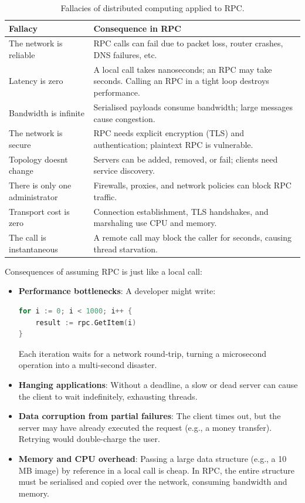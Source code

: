 \documentclass[a4paper]{article}
\begin{document}
\begin{table}[H]
\centering
\begin{tabular}{|p{4.5cm}|p{9cm}|}
\hline
\textbf{Fallacy} & \textbf{Consequence in RPC} \\
\hline
The network is reliable & RPC calls can fail due to packet loss, router crashes, DNS failures, etc. \\
Latency is zero & A local call takes nanoseconds; an RPC may take seconds. Calling an RPC in a tight loop destroys performance. \\
Bandwidth is infinite & Serialised payloads consume bandwidth; large messages cause congestion. \\
The network is secure & RPC needs explicit encryption (TLS) and authentication; plaintext RPC is vulnerable. \\
Topology doesnt change & Servers can be added, removed, or fail; clients need service discovery. \\
There is only one administrator & Firewalls, proxies, and network policies can block RPC traffic. \\
Transport cost is zero & Connection establishment, TLS handshakes, and marshaling use CPU and memory. \\
The call is instantaneous & A remote call may block the caller for seconds, causing thread starvation. \\
\hline
\end{tabular}
\caption{Fallacies of distributed computing applied to RPC.}
\end{table}

Consequences of assuming RPC is just like a local call:

\begin{itemize}
    \item \textbf{Performance bottlenecks}: A developer might write:
        \begin{lstlisting}[language=Go]
for i := 0; i < 1000; i++ {
    result := rpc.GetItem(i)
}
\end{lstlisting}
        Each iteration waits for a network round-trip, turning a microsecond operation into a multi-second disaster.
    \item \textbf{Hanging applications}: Without a deadline, a slow or dead server can cause the client to wait indefinitely, exhausting threads.
    \item \textbf{Data corruption from partial failures}: The client times out, but the server may have already executed the request (e.g., a money transfer). Retrying would double-charge the user.
    \item \textbf{Memory and CPU overhead}: Passing a large data structure (e.g., a 10 MB image) by reference in a local call is cheap. In RPC, the entire structure must be serialised and copied over the network, consuming bandwidth and memory.
\end{itemize}
\end{document}
